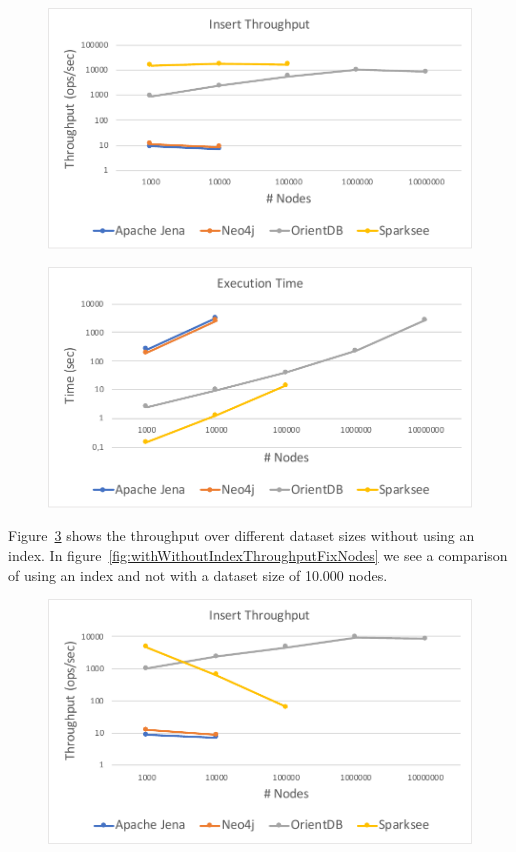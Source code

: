 \begin{figure}[h!]
  \centering
  \includegraphics[width=.75\textwidth]{images/throughput/withIndexThroughput}
  \label{fig:withIndexThroughput}
\end{figure}

\begin{figure}[h!]
  \centering
  \includegraphics[width=.75\textwidth]{images/throughput/withIndexExecutionTime}
  \label{fig:withIndexExecutionTime}
\end{figure}

Figure~\ref{fig:withoutIndexThroughput} shows the throughput over different dataset sizes without using an index.
In figure~\ref{fig:withWithoutIndexThroughputFixNodes} we see a comparison of using an index and not with a dataset size of 10.000 nodes.

\begin{figure}[h!]
  \centering
  \includegraphics[width=.75\textwidth]{images/throughput/withoutIndexThroughput}
  \label{fig:withoutIndexThroughput}
\end{figure}

